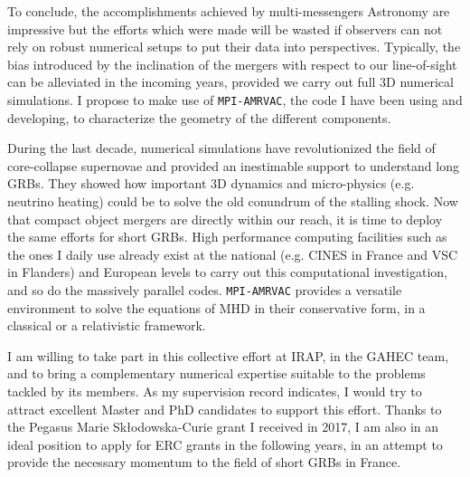 \documentclass[11pt,onecolumn]{article}
\makeatletter
\newcommand{\grbs}{GRBs\xspace}
\newcommand{\mhd}{MHD\xspace}
\newcommand*{\eg}{e.g.\@\xspace}
\makeatother
\begin{document}
%
%
%

\newpage 

To conclude, the accomplishments achieved by multi-messengers Astronomy are impressive but the efforts which were made will be wasted if observers can not rely on robust numerical setups to put their data into perspectives. Typically, the bias introduced by the inclination of the mergers with respect to our line-of-sight can be alleviated in the incoming years, provided we carry out full 3D numerical simulations. I propose to make use of \texttt{MPI-AMRVAC}, the code I have been using and developing, to characterize the geometry of the different components.

During the last decade, numerical simulations have revolutionized the field of core-collapse supernovae and provided an inestimable support to understand long \grbs. They showed how important 3D dynamics and micro-physics (\eg neutrino heating) could be to solve the old conundrum of the stalling shock. Now that compact object mergers are directly within our reach, it is time to deploy the same efforts for short \grbs. High performance computing facilities such as the ones I daily use already exist at the national (\eg CINES in France and VSC in Flanders) and European levels to carry out this computational investigation, and so do the massively parallel codes. \texttt{MPI-AMRVAC} provides a versatile environment to solve the equations of \mhd in their conservative form, in a classical or a relativistic framework. 

I am willing to take part in this collective effort at IRAP, in the GAHEC team, and to bring a complementary numerical expertise suitable to the problems tackled by its members. As my supervision record indicates, I would try to attract excellent Master and PhD candidates to support this effort. Thanks to the Pegasus Marie Sk\l{}odowska-Curie grant I received in 2017, I am also in an ideal position to apply for ERC grants in the following years, in an attempt to provide the necessary momentum to the field of short \grbs in France.
\end{document}
